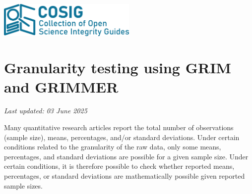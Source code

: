 \documentclass[letterpaper, 12pt]{article}
\begin{document}
\flushleft
\includegraphics[width=0.5\textwidth]{img/home/241017_final_logo_mockup.png}

\section*{Granularity testing using GRIM and GRIMMER}
\textit{Last updated: 03 June 2025}

Many quantitative research articles report the total number of observations (sample size), means, percentages, and/or standard deviations. Under certain conditions related to the granularity of the raw data, only some means, percentages, and standard deviations are possible for a given sample size. Under certain conditions, it is therefore possible to check whether reported means, percentages, or standard deviations are mathematically possible given reported sample sizes. 
\end{document}
